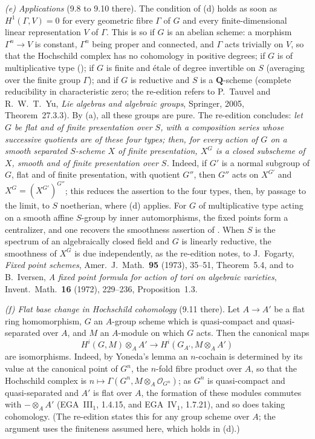 \emph{(e) Applications} (9.8 to 9.10 there). The condition of (d) holds as
soon as \(H^1(\Gamma,V)=0\) for every geometric fibre \(\Gamma\) of \(G\) and
every finite-dimensional linear representation \(V\) of \(\Gamma\). This is
so if \(G\) is an abelian scheme: a morphism \(\Gamma^n\to V\) is constant,
\(\Gamma^n\) being proper and connected, and \(\Gamma\) acts trivially on
\(V\), so that the Hochschild complex has no cohomology in positive degrees;
if \(G\) is of multiplicative type (); if \(G\) is
finite and étale of degree invertible on \(S\) (averaging over the finite
group \(\Gamma\)); and if \(G\) is reductive and \(S\) is a
\(\mathbf Q\)-scheme (complete reducibility in characteristic zero; the
re-edition refers to P.~Tauvel and R.~W.~T.~Yu, \emph{Lie algebras and
algebraic groups}, Springer, 2005, Theorem~27.3.3). By (a), all these groups
are pure. The re-edition concludes: \emph{let \(G\) be flat and of finite
presentation over \(S\), with a composition series whose successive
quotients are of these four types; then, for every action of \(G\) on a
smooth separated \(S\)-scheme \(X\) of finite presentation, \(X^G\) is a
closed subscheme of \(X\), smooth and of finite presentation over \(S\).}
Indeed, if \(G'\) is a normal subgroup of \(G\), flat and of finite
presentation, with quotient \(G''\), then \(G''\) acts on \(X^{G'}\) and
\(X^G=(X^{G'})^{G''}\); this reduces the assertion to the four types, then,
by passage to the limit, to \(S\) noetherian, where (d) applies. For \(G\)
of multiplicative type acting on a smooth affine \(S\)-group by inner
automorphisms, the fixed points form a centralizer, and one recovers the
smoothness assertion of . When \(S\) is the
spectrum of an algebraically closed field and \(G\) is linearly reductive,
the smoothness of \(X^G\) is due independently, as the re-edition notes, to
J.~Fogarty, \emph{Fixed point schemes}, Amer.\ J.\ Math.\ \textbf{95}
(1973), 35--51, Theorem~5.4, and to B.~Iversen, \emph{A fixed point formula
for action of tori on algebraic varieties}, Invent.\ Math.\ \textbf{16}
(1972), 229--236, Proposition~1.3.

\emph{(f) Flat base change in Hochschild cohomology} (9.11 there). Let
\(A\to A'\) be a flat ring homomorphism, \(G\) an \(A\)-group scheme which is
quasi-compact and quasi-separated over \(A\), and \(M\) an \(A\)-module on
which \(G\) acts. Then the canonical maps
\[
  H^i(G,M)\otimes_AA'\longrightarrow H^i(G_{A'},M\otimes_AA')
\]
are isomorphisms. Indeed, by Yoneda's lemma an \(n\)-cochain is determined
by its value at the canonical point of \(G^n\), the \(n\)-fold fibre product
over \(A\), so that the Hochschild complex is
\(n\mapsto\Gamma(G^n,M\otimes_A\mathcal O_{G^n})\); as \(G^n\) is
quasi-compact and quasi-separated and \(A'\) is flat over \(A\), the
formation of these modules commutes with \(-\otimes_AA'\)
(EGA~III\(_1\), 1.4.15, and EGA~IV\(_1\), 1.7.21), and so does taking
cohomology. (The re-edition states this for any group scheme over \(A\); the
argument uses the finiteness assumed here, which holds in (d).)
\par\medskip


